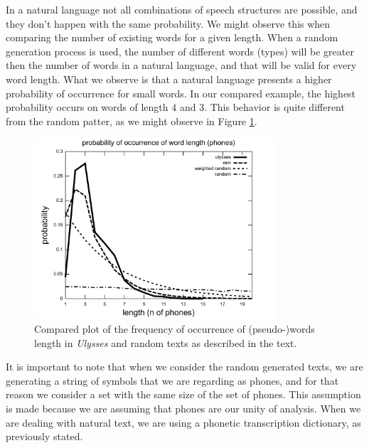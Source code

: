 In a natural language not all combinations of speech structures are possible, and they don't happen
with the same probability. We might observe this when comparing the number of existing words for a given
length. When a random generation process is used, the number of different words (types) will be greater  
then the number of words in a natural language, and that will be valid for every word length.
What we observe is that a natural language presents a higher probability of occurrence for small
words. In our compared example, the highest probability occurs on words of length $4$ and $3$.
This behavior is quite different from the random patter, as we might observe in Figure
\ref{fig:ulysses_compared_word_length_probabilities}.


\begin{figure}[h]
\centering  
\includegraphics[width=0.8\textwidth]{images/ulysses_compared_word_length_probabilities.pdf}  
\caption{Compared plot of the frequency of occurrence of (pseudo-)words length in \textit{Ulysses} and random texts as described in the text.}
\label{fig:ulysses_compared_word_length_probabilities}  
\end{figure} 

It is important to note that when we consider the random generated texts, we are generating a
string of symbols that we are regarding as phones, and for that reason we consider a set with
the same size of the set of phones. This assumption is made because we are assuming that phones
are our unity of analysis. When we are dealing with natural text, we are using a phonetic
transcription dictionary, as previously stated.

